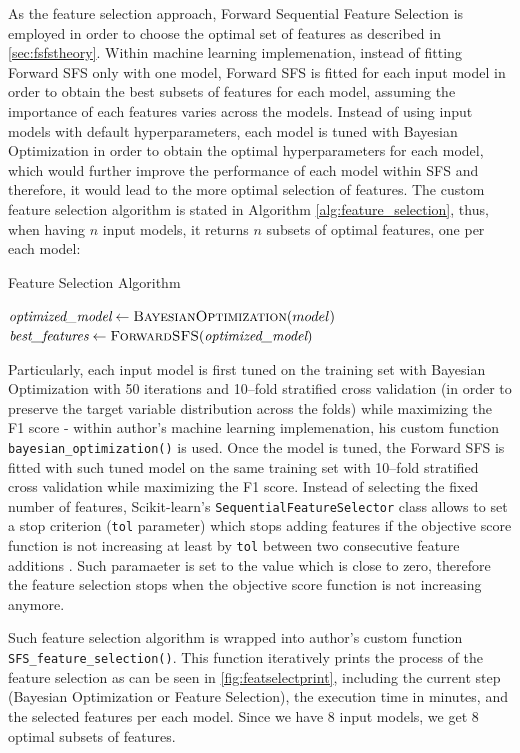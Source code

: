 As the feature selection approach, Forward Sequential Feature Selection is employed in order to choose the optimal set of features as described in \autoref{sec:fsfstheory}.
Within machine learning implemenation, instead of fitting Forward SFS only with one model, Forward SFS is fitted for each input model in order to obtain the best subsets of features for each model, assuming the importance of each features varies across the models.
Instead of using input models with default hyperparameters, each model is tuned with Bayesian Optimization in order to obtain the optimal hyperparameters for each model, which would further improve the performance of each model within SFS and therefore, it would lead to the more optimal selection of features.
The custom feature selection algorithm is stated in Algorithm \autoref{alg:feature_selection}, thus, when having $n$ input models, it returns $n$  subsets of optimal features, one per each model:
\begin{algorithm}[H]
\caption{Feature Selection Algorithm}
\label{alg:feature_selection}
\begin{algorithmic}[1]
    \State $\textit{optimized\_model} \gets \textsc{BayesianOptimization}(model)$
    \State $\textit{best\_features} \gets \textsc{ForwardSFS}(\textit{optimized\_model})$
\EndFor
\end{algorithmic}
\end{algorithm}
Particularly, each input model is first tuned on the training set with Bayesian Optimization with 50 iterations and 10--fold stratified cross validation (in order to preserve the target variable distribution across the folds) while maximizing the F1 score - within author's machine learning implemenation, his custom function \lstinline{bayesian_optimization()} is used.
Once the model is tuned, the Forward SFS is fitted with such tuned model on the same training set with 10--fold stratified cross validation while maximizing the F1 score. Instead of selecting the fixed number of features, Scikit-learn's \lstinline{SequentialFeatureSelector} class allows to set a stop criterion (\lstinline{tol} parameter) which stops adding features if the objective score function is not increasing at least by \lstinline{tol} between two consecutive feature additions \citep{sfs}.
Such paramaeter is set to the value which is close to zero, therefore the feature selection stops when the objective score function is not increasing anymore.

Such feature selection algorithm is wrapped into author's custom function \lstinline{SFS_feature_selection()}.
This function iteratively prints the process of the feature selection as can be seen in \autoref{fig:featselectprint}, including the current step (Bayesian Optimization or Feature Selection), the execution time in minutes, and the selected features per each model. Since we have 8 input models, we get 8 optimal subsets of features.

